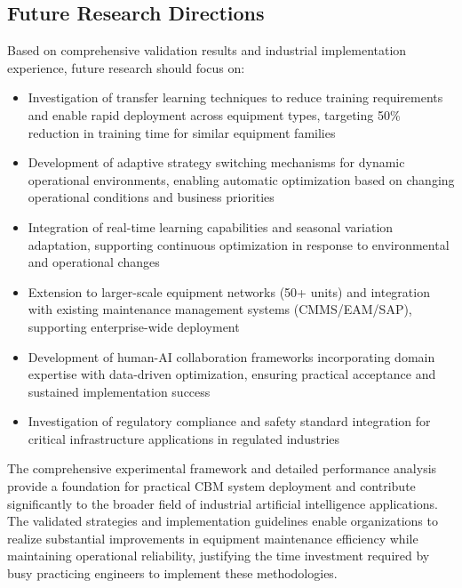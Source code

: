 \documentclass[twocolumn]{article}
\begin{document}
\subsection{Future Research Directions}

Based on comprehensive validation results and industrial implementation experience, future research should focus on:

\begin{itemize}
\item Investigation of transfer learning techniques to reduce training requirements and enable rapid deployment across equipment types, targeting 50\% reduction in training time for similar equipment families
\item Development of adaptive strategy switching mechanisms for dynamic operational environments, enabling automatic optimization based on changing operational conditions and business priorities
\item Integration of real-time learning capabilities and seasonal variation adaptation, supporting continuous optimization in response to environmental and operational changes
\item Extension to larger-scale equipment networks (50+ units) and integration with existing maintenance management systems (CMMS/EAM/SAP), supporting enterprise-wide deployment
\item Development of human-AI collaboration frameworks incorporating domain expertise with data-driven optimization, ensuring practical acceptance and sustained implementation success
\item Investigation of regulatory compliance and safety standard integration for critical infrastructure applications in regulated industries
\end{itemize}

The comprehensive experimental framework and detailed performance analysis provide a foundation for practical CBM system deployment and contribute significantly to the broader field of industrial artificial intelligence applications. The validated strategies and implementation guidelines enable organizations to realize substantial improvements in equipment maintenance efficiency while maintaining operational reliability, justifying the time investment required by busy practicing engineers to implement these methodologies.
\end{document}
